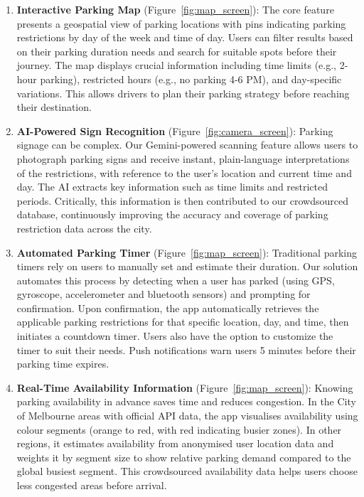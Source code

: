 \begin{enumerate}
    \item \textbf{Interactive Parking Map} (Figure~\ref{fig:map_screen}): The core feature presents a geospatial view of parking locations with pins indicating parking restrictions by day of the week and time of day. Users can filter results based on their parking duration needs and search for suitable spots before their journey. The map displays crucial information including time limits (e.g., 2-hour parking), restricted hours (e.g., no parking 4-6 PM), and day-specific variations. This allows drivers to plan their parking strategy before reaching their destination.
    
    \item \textbf{AI-Powered Sign Recognition} (Figure~\ref{fig:camera_screen}): Parking signage can be complex. Our Gemini-powered scanning feature allows users to photograph parking signs and receive instant, plain-language interpretations of the restrictions, with reference to the user's location and current time and day. The AI extracts key information such as time limits and restricted periods. Critically, this information is then contributed to our crowdsourced database, continuously improving the accuracy and coverage of parking restriction data across the city.
    
    \item \textbf{Automated Parking Timer} (Figure~\ref{fig:map_screen}): Traditional parking timers rely on users to manually set and estimate their duration. Our solution automates this process by detecting when a user has parked (using GPS, gyroscope, accelerometer and bluetooth sensors) and prompting for confirmation. Upon confirmation, the app automatically retrieves the applicable parking restrictions for that specific location, day, and time, then initiates a countdown timer. Users also have the option to customize the timer to suit their needs. Push notifications warn users 5 minutes before their parking time expires.
    
    \item \textbf{Real-Time Availability Information} (Figure~\ref{fig:map_screen}): Knowing parking availability in advance saves time and reduces congestion. In the City of Melbourne areas with official API data, the app visualises availability using colour segments (orange to red, with red indicating busier zones). In other regions, it estimates availability from anonymised user location data and weights it by segment size to show relative parking demand compared to the global busiest segment. This crowdsourced availability data helps users choose less congested areas before arrival.
    
\end{enumerate}
